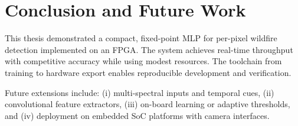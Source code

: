 \chapter{Conclusion and Future Work}\label{chap:conclusion}
This thesis demonstrated a compact, fixed-point MLP for per-pixel wildfire detection implemented on an FPGA. The system achieves real-time throughput with competitive accuracy while using modest resources. The toolchain from training to hardware export enables reproducible development and verification.

Future extensions include: (i) multi-spectral inputs and temporal cues, (ii) convolutional feature extractors, (iii) on-board learning or adaptive thresholds, and (iv) deployment on embedded SoC platforms with camera interfaces.
